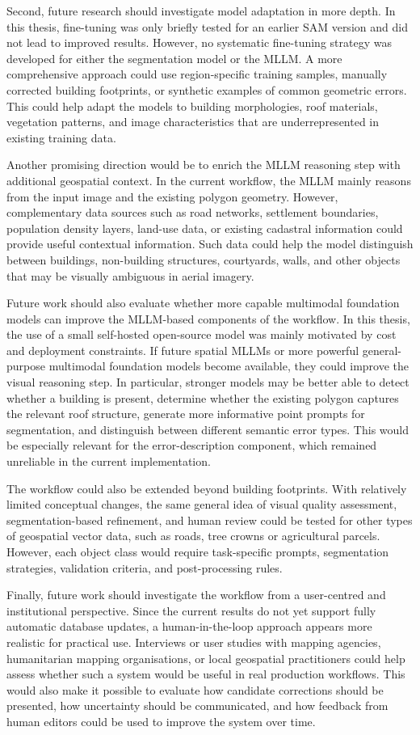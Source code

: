 Second, future research should investigate model adaptation in more depth. In this thesis, fine-tuning was only briefly tested for an earlier SAM version and did not lead to improved results. However, no systematic fine-tuning strategy was developed for either the segmentation model or the MLLM. A more comprehensive approach could use region-specific training samples, manually corrected building footprints, or synthetic examples of common geometric errors. This could help adapt the models to building morphologies, roof materials, vegetation patterns, and image characteristics that are underrepresented in existing training data.

Another promising direction would be to enrich the MLLM reasoning step with additional geospatial context. In the current workflow, the MLLM mainly reasons from the input image and the existing polygon geometry. However, complementary data sources such as road networks, settlement boundaries, population density layers, land-use data, or existing cadastral information could provide useful contextual information. Such data could help the model distinguish between buildings, non-building structures, courtyards, walls, and other objects that may be visually ambiguous in aerial imagery.

Future work should also evaluate whether more capable multimodal foundation models can improve the MLLM-based components of the workflow. In this thesis, the use of a small self-hosted open-source model was mainly motivated by cost and deployment constraints. If future spatial MLLMs or more powerful general-purpose multimodal foundation models become available, they could improve the visual reasoning step. In particular, stronger models may be better able to detect whether a building is present, determine whether the existing polygon captures the relevant roof structure, generate more informative point prompts for segmentation, and distinguish between different semantic error types. This would be especially relevant for the error-description component, which remained unreliable in the current implementation.

The workflow could also be extended beyond building footprints. With relatively limited conceptual changes, the same general idea of visual quality assessment, segmentation-based refinement, and human review could be tested for other types of geospatial vector data, such as roads, tree crowns or agricultural parcels. However, each object class would require task-specific prompts, segmentation strategies, validation criteria, and post-processing rules.

Finally, future work should investigate the workflow from a user-centred and institutional perspective. Since the current results do not yet support fully automatic database updates, a human-in-the-loop approach appears more realistic for practical use. Interviews or user studies with mapping agencies, humanitarian mapping organisations, or local geospatial practitioners could help assess whether such a system would be useful in real production workflows. This would also make it possible to evaluate how candidate corrections should be presented, how uncertainty should be communicated, and how feedback from human editors could be used to improve the system over time.


